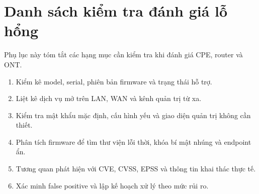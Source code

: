 \documentclass[../DoAn.tex]{subfiles}
\begin{document}
\section{Danh sách kiểm tra đánh giá lỗ hổng}
Phụ lục này tóm tắt các hạng mục cần kiểm tra khi đánh giá CPE, router và ONT.

\begin{enumerate}
    \item Kiểm kê model, serial, phiên bản firmware và trạng thái hỗ trợ.
    \item Liệt kê dịch vụ mở trên LAN, WAN và kênh quản trị từ xa.
    \item Kiểm tra mật khẩu mặc định, cấu hình yếu và giao diện quản trị không cần thiết.
    \item Phân tích firmware để tìm thư viện lỗi thời, khóa bí mật nhúng và endpoint ẩn.
    \item Tương quan phát hiện với CVE, CVSS, EPSS và thông tin khai thác thực tế.
    \item Xác minh false positive và lập kế hoạch xử lý theo mức rủi ro.
\end{enumerate}
\end{document}
